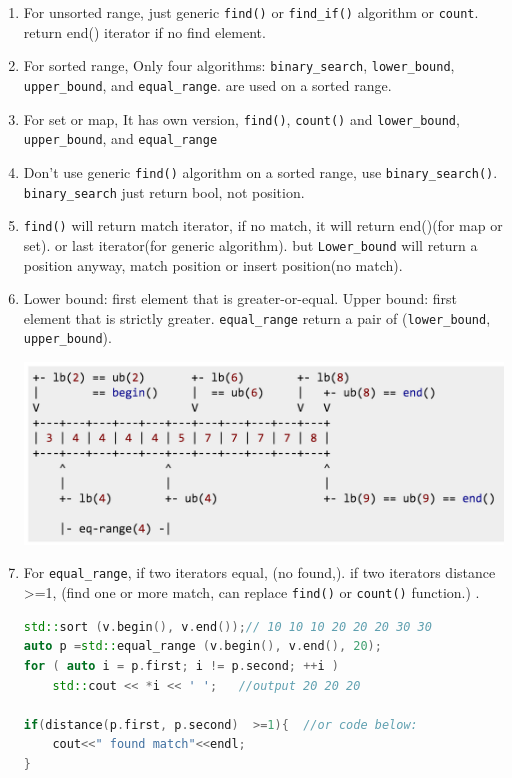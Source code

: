 \documentclass[a4paper,11pt,twoside]{book}
\begin{document}
\begin{itemize}
	\begin{enumerate}
	\item For unsorted range, just generic \texttt{find()} or \texttt{find\_if()} algorithm or \texttt{count}. return end() iterator if no find element.
	
	\item For sorted range, Only four algorithms: \texttt{binary\_search}, \texttt{lower\_bound}, \texttt{upper\_bound}, and \texttt{equal\_range}. are used on a sorted range.
	
	\item For set or map, It has own version, \texttt{find()}, \texttt{count()} and \texttt{lower\_bound}, \texttt{upper\_bound}, and \texttt{equal\_range}
	
	\item Don't use generic \texttt{find()} algorithm on a sorted range,  use \texttt{binary\_search()}. \texttt{binary\_search} just return bool, not position.
	
	\item  \texttt{find()} will return match iterator, if no match, it will return end()(for map or set). or last iterator(for generic algorithm). but \texttt{Lower\_bound}  will return a position anyway, match position or insert position(no match).
	
	\item Lower bound: first element that is greater-or-equal. Upper bound: first element that is strictly greater. \texttt{equal\_range} return a pair of (\texttt{lower\_bound}, \texttt{upper\_bound}).
	
	\begin{center}
		\includegraphics[scale=0.5]{pics/lowerupper.png}
	\end{center}
	
	
	\item For \texttt{equal\_range}, if two iterators equal, (no found,). if two iterators distance >=1, (find one or more match, can replace \texttt{find()} or \texttt{count()} function.) .
\begin{lstlisting}[frame=single, language=c++]
std::sort (v.begin(), v.end());// 10 10 10 20 20 20 30 30
auto p =std::equal_range (v.begin(), v.end(), 20);
for ( auto i = p.first; i != p.second; ++i )
	std::cout << *i << ' ';   //output 20 20 20

if(distance(p.first, p.second)  >=1){  //or code below:
	cout<<" found match"<<endl;
}	
\end{lstlisting}	
	
	\end{enumerate}
\end{itemize}
\end{document}
